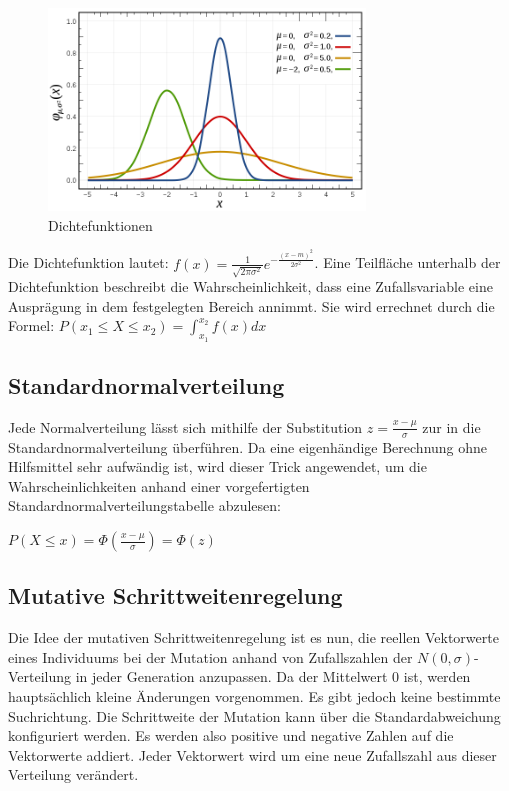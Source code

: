 \begin{figure}[H]
\centering
\includegraphics[width=0.75\textwidth]{img/Glockenkurven.png}
\caption[Dichtefunktionen]{Dichtefunktionen\protect\footnotemark}
\label{fig:glockenkurven}
\end{figure}

Die Dichtefunktion lautet: $f(x) = \frac{1}{\sqrt{2 \pi \sigma^2}} e^{-\frac{(x-m)^2}{2 \sigma^2}}$. Eine Teilfläche unterhalb der Dichtefunktion beschreibt die Wahrscheinlichkeit, dass eine Zufallsvariable eine Ausprägung in dem festgelegten Bereich annimmt. Sie wird errechnet durch die Formel: $P(x_1 \le X \le x_2) = \int_{x_1}^{x_2} f(x) dx$

\subsection{Standardnormalverteilung}

Jede Normalverteilung lässt sich mithilfe der Substitution $z = \frac{x - \mu}{\sigma}$ zur in die Standardnormalverteilung überführen.
Da eine eigenhändige Berechnung ohne Hilfsmittel sehr aufwändig ist, wird dieser Trick angewendet, um die Wahrscheinlichkeiten anhand einer vorgefertigten Standardnormalverteilungstabelle abzulesen:

$P(X \le x) = \Phi(\frac{x - \mu}{\sigma}) = \Phi(z)$

\subsection{Mutative Schrittweitenregelung}

Die Idee der mutativen Schrittweitenregelung ist es nun, die reellen Vektorwerte eines Individuums bei der Mutation anhand von Zufallszahlen der $N(0, \sigma)$-Verteilung in jeder Generation anzupassen. Da der Mittelwert $0$ ist, werden hauptsächlich kleine Änderungen vorgenommen. Es gibt jedoch keine bestimmte Suchrichtung. Die Schrittweite der Mutation kann über die Standardabweichung konfiguriert werden. Es werden also positive und negative Zahlen auf die Vektorwerte addiert. Jeder Vektorwert wird um eine neue Zufallszahl aus dieser Verteilung verändert.

